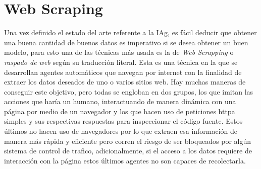 


\section{Web Scraping}
Una vez definido el estado del arte referente a la \gls{IAg}, es
fácil deducir que obtener una buena cantidad de buenos datos es imperativo si se
desea obtener un buen modelo, para esto una de las técnicas más usada es la de
\textit{Web Scrapping} o \textit{raspado de web} según su traducción literal. Esta es una
técnica en la que se desarrollan agentes automáticos que navegan por internet
con la finalidad de extraer los datos deseados de uno o varios sitios web. Hay
muchas maneras de conseguir este objetivo, pero todas se engloban en dos grupos,
los que imitan las acciones que haría un humano, interactuando de manera
dinámica con una página por medio de un navegador y los que hacen uso de
peticiones \gls{httpa} simples y sus respectivas respuestas para inspeccionar el código
fuente. Estos últimos no hacen uso de navegadores por lo que extraen esa
información de manera más rápida y eficiente pero corren el riesgo de ser
bloqueados por algún sistema de control de trafico, adicionalmente, si el acceso
a los datos requiere de interacción con la página estos últimos agentes no son
capaces de recolectarla. \cite{zhao2017web}


